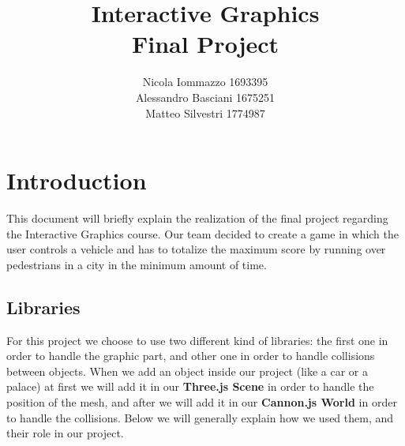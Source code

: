 \documentclass[a4paper, 11pt, titlepage]{report}
\begin{document}
\titleformat{\chapter}[display]
    {\normalfont\huge\bfseries}{\chaptertitlename\ \thechapter}{20pt}{\Huge}
\titlespacing*{\chapter}{0pt}{0pt}{10pt}

\hypersetup{
	linkcolor=black,
	citecolor=black,
	urlcolor=black
}

\title{
	Interactive Graphics\\
	\large Final Project
}
\author{Nicola Iommazzo 1693395\\
		Alessandro Basciani 1675251\\
		Matteo Silvestri 1774987\\ }
\date{}
\maketitle

\tableofcontents

%
%

\chapter{Introduction}
    This document will briefly explain the realization of the final project regarding the Interactive Graphics course. Our team decided to create a game in which the user controls a vehicle and has to totalize the maximum score by running over pedestrians in a city in the minimum amount of time.

 	\section{Libraries}
 		\par For this project we choose to use two different kind of libraries: the first one in order to handle the graphic part, and other one in order to handle collisions between objects. When we add an object inside our project (like a car or a palace) at first we will add it in our \textbf{Three.js Scene} in order to handle the position of the mesh, and after we will add it in our \textbf{Cannon.js World} in order to handle the collisions. Below we will generally explain how we used them, and their role in our project. 
\end{document}
